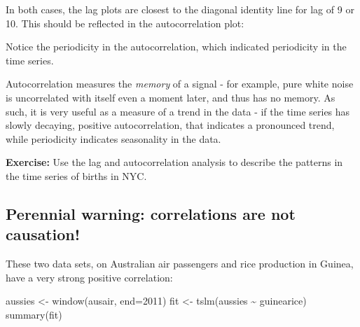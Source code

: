 \documentclass[
  letterpaper,
  DIV=11,
  numbers=noendperiod]{scrreprt}
\newenvironment{Shaded}{\begin{snugshade}}{\end{snugshade}}
\newcommand{\NormalTok}[1]{\textcolor[rgb]{0.00,0.23,0.31}{#1}}
\begin{document}
\begin{Shaded}
\end{Shaded}

In both cases, the lag plots are closest to the diagonal identity line
for lag of 9 or 10. This should be reflected in the autocorrelation
plot:

\begin{Shaded}
\end{Shaded}

Notice the periodicity in the autocorrelation, which indicated
periodicity in the time series.

Autocorrelation measures the \emph{memory} of a signal - for example,
pure white noise is uncorrelated with itself even a moment later, and
thus has no memory. As such, it is very useful as a measure of a trend
in the data - if the time series has slowly decaying, positive
autocorrelation, that indicates a pronounced trend, while periodicity
indicates seasonality in the data.

\textbf{Exercise:} Use the lag and autocorrelation analysis to describe
the patterns in the time series of births in NYC.

\subsection{Perennial warning: correlations are not
causation!}\label{perennial-warning-correlations-are-not-causation}

These two data sets, on Australian air passengers and rice production in
Guinea, have a very strong positive correlation:

\begin{Shaded}
\begin{Highlighting}[]
\NormalTok{aussies \textless{}{-} window(ausair, end=2011)}
\NormalTok{fit \textless{}{-} tslm(aussies \textasciitilde{} guinearice)}
\NormalTok{summary(fit)}
\end{Highlighting}
\end{Shaded}
\end{document}
